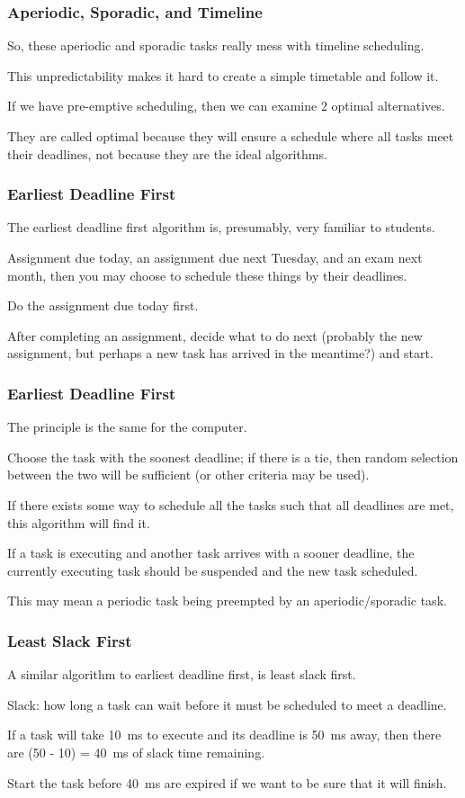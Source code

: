 \begin{frame}
\frametitle{Aperiodic, Sporadic, and Timeline}

So, these aperiodic and sporadic tasks really mess with timeline scheduling. 

This unpredictability makes it hard to create a simple timetable and follow it.

If we have pre-emptive scheduling, then we can examine 2 optimal alternatives. 

They are called optimal because they will ensure a schedule where all tasks meet their deadlines, not because they are the ideal algorithms.



\end{frame}

\begin{frame}
\frametitle{Earliest Deadline First}

The earliest deadline first algorithm is, presumably, very familiar to students. 

Assignment due today, an assignment due next Tuesday, and an exam next month, then you may choose to schedule these things by their deadlines. 

Do the assignment due today first. 

After completing an assignment, decide what to do next (probably the new assignment, but perhaps a new task has arrived in the meantime?) and start.


\end{frame}

\begin{frame}
\frametitle{Earliest Deadline First}

The principle is the same for the computer. 

Choose the task with the soonest deadline; if there is a tie, then random selection between the two will be sufficient (or other criteria may be used). 

If there exists some way to schedule all the tasks such that all deadlines are met, this algorithm will find it. 

If a task is executing and another task arrives with a sooner deadline, the currently executing task should be suspended and the new task scheduled. 

This may mean a periodic task being preempted by an aperiodic/sporadic task.


\end{frame}

\begin{frame}
\frametitle{Least Slack First}

A similar algorithm to earliest deadline first, is least slack first.

\alert{Slack}: how long a task can wait before it must be scheduled to meet a deadline.

If a task will take 10~ms to execute and its deadline is 50~ms away, then there are (50 - 10) = 40~ms of slack time remaining.

Start the task before 40~ms are expired if we want to be sure that it will finish. 

\end{frame}



